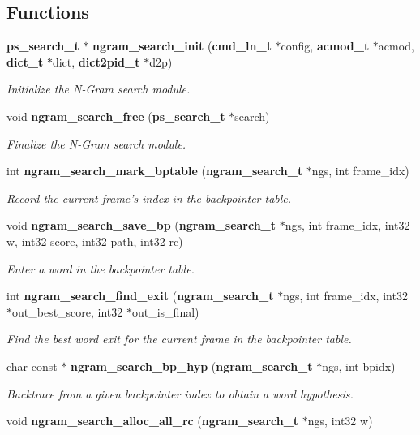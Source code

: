 \subsection*{Functions}
\begin{DoxyCompactItemize}
\item 
{\bf ps\-\_\-search\-\_\-t} $\ast$ {\bf ngram\-\_\-search\-\_\-init} ({\bf cmd\-\_\-ln\-\_\-t} $\ast$config, {\bf acmod\-\_\-t} $\ast$acmod, {\bf dict\-\_\-t} $\ast$dict, {\bf dict2pid\-\_\-t} $\ast$d2p)\label{ngram__search_8c_afa0dcbb86340083bce1412c9309742bc}

\begin{DoxyCompactList}\small\item\em Initialize the N-\/\-Gram search module. \end{DoxyCompactList}\item 
void {\bf ngram\-\_\-search\-\_\-free} ({\bf ps\-\_\-search\-\_\-t} $\ast$search)\label{ngram__search_8c_aeaf140dc2bbeaa5c274f73480b5328f3}

\begin{DoxyCompactList}\small\item\em Finalize the N-\/\-Gram search module. \end{DoxyCompactList}\item 
int {\bf ngram\-\_\-search\-\_\-mark\-\_\-bptable} ({\bf ngram\-\_\-search\-\_\-t} $\ast$ngs, int frame\-\_\-idx)
\begin{DoxyCompactList}\small\item\em Record the current frame's index in the backpointer table. \end{DoxyCompactList}\item 
void {\bf ngram\-\_\-search\-\_\-save\-\_\-bp} ({\bf ngram\-\_\-search\-\_\-t} $\ast$ngs, int frame\-\_\-idx, int32 w, int32 score, int32 path, int32 rc)\label{ngram__search_8c_ae36649be6f5a2190e759e7ed13bd7b6b}

\begin{DoxyCompactList}\small\item\em Enter a word in the backpointer table. \end{DoxyCompactList}\item 
int {\bf ngram\-\_\-search\-\_\-find\-\_\-exit} ({\bf ngram\-\_\-search\-\_\-t} $\ast$ngs, int frame\-\_\-idx, int32 $\ast$out\-\_\-best\-\_\-score, int32 $\ast$out\-\_\-is\-\_\-final)
\begin{DoxyCompactList}\small\item\em Find the best word exit for the current frame in the backpointer table. \end{DoxyCompactList}\item 
char const $\ast$ {\bf ngram\-\_\-search\-\_\-bp\-\_\-hyp} ({\bf ngram\-\_\-search\-\_\-t} $\ast$ngs, int bpidx)
\begin{DoxyCompactList}\small\item\em Backtrace from a given backpointer index to obtain a word hypothesis. \end{DoxyCompactList}\item 
void {\bf ngram\-\_\-search\-\_\-alloc\-\_\-all\-\_\-rc} ({\bf ngram\-\_\-search\-\_\-t} $\ast$ngs, int32 w)\label{ngram__search_8c_a1ddcc1a9cb3e164ceb2140097ed23a3e}


\end{DoxyCompactItemize}
